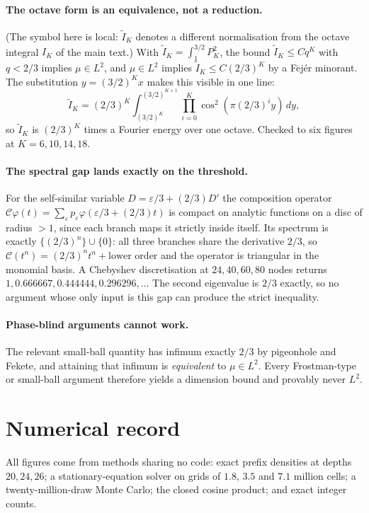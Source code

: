 \documentclass[11pt]{article}
\theoremstyle{remark}
\newcommand{\eps}{\varepsilon}
\begin{document}
\paragraph{The octave form is an equivalence, not a reduction.} (The symbol here is local: $\widetilde I_K$ denotes a different normalisation from the octave integral $I_K$ of the main text.) With $\widetilde I_K=\int_1^{3/2}P_K^2$, the bound
$\widetilde I_K\le Cq^K$ with $q<2/3$ implies $\mu\in L^2$, and $\mu\in L^2$ implies $\widetilde I_K\le C(2/3)^K$ by a Fej\'er
minorant. The substitution $y=(3/2)^Kx$ makes this visible in one line:
\[
  \widetilde I_K=(2/3)^K\int_{(3/2)^K}^{(3/2)^{K+1}}\prod_{i=0}^{K}\cos^2(\pi(2/3)^iy)\,dy,
\]
so $\widetilde I_K$ is $(2/3)^K$ times a Fourier energy over one octave. Checked to six figures at
$K=6,10,14,18$.

\paragraph{The spectral gap lands exactly on the threshold.} For the self-similar variable
$D=\eps/3+(2/3)D'$ the composition operator $\mathcal C\varphi(t)=\sum_\eps p_\eps\varphi(\eps/3+(2/3)t)$
is compact on analytic functions on a disc of radius $>1$, since each branch maps it strictly inside
itself. Its spectrum is exactly $\{(2/3)^n\}\cup\{0\}$: all three branches share the derivative $2/3$, so
$\mathcal C(t^n)=(2/3)^nt^n+\text{lower order}$ and the operator is triangular in the monomial basis. A
Chebyshev discretisation at $24,40,60,80$ nodes returns $1,0.666667,0.444444,0.296296,\dots$ The second
eigenvalue is $2/3$ exactly, so no argument whose only input is this gap can produce the strict
inequality.

\paragraph{Phase-blind arguments cannot work.} The relevant small-ball quantity has infimum exactly
$2/3$ by pigeonhole and Fekete, and attaining that infimum is \emph{equivalent} to $\mu\in L^2$. Every
Frostman-type or small-ball argument therefore yields a dimension bound and provably never $L^2$.

\section{Numerical record}

All figures come from methods sharing no code: exact prefix densities at depths $20,24,26$; a
stationary-equation solver on grids of $1.8$, $3.5$ and $7.1$ million cells; a twenty-million-draw Monte
Carlo; the closed cosine product; and exact integer counts.
\end{document}
